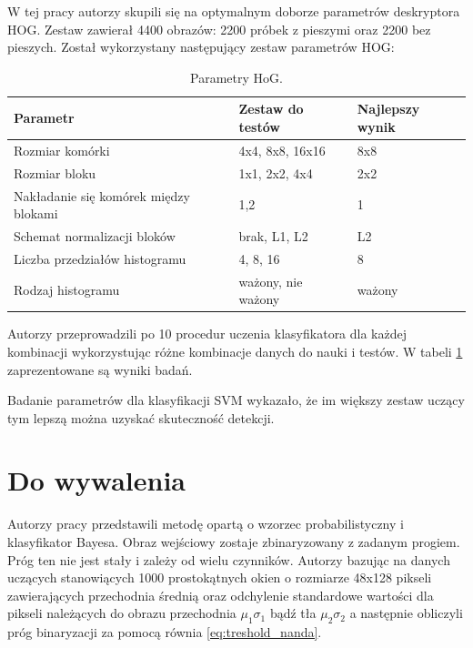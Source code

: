W tej pracy autorzy skupili się na optymalnym doborze parametrów deskryptora HOG. 
Zestaw zawierał 4400 obrazów: 2200 próbek z pieszymi oraz 2200 bez pieszych. 
Został wykorzystany następujący zestaw parametrów HOG:
\begin{table}[!h]
\centering 
\begin{threeparttable}
\caption{Parametry HoG.}
\label{tab:parametryhog}
\begin{tabularx}{1\textwidth}{|l|X|X|}


\hline Parametr & Zestaw do testów & Najlepszy wynik \\ 
\hline Rozmiar komórki & 4x4, 8x8, 16x16 & 8x8 \\ 
\hline Rozmiar bloku & 1x1, 2x2, 4x4 & 2x2 \\ 
\hline Nakładanie się komórek między blokami & 1,2 & 1 \\ 
\hline Schemat normalizacji bloków & brak, L1, L2 & L2 \\ 
\hline Liczba przedziałów histogramu & 4, 8, 16 & 8 \\ 
\hline Rodzaj histogramu & ważony, nie ważony & ważony \\ 
\hline 


\end{tabularx} 
\end{threeparttable}
\end{table} 

Autorzy przeprowadzili po 10 procedur uczenia klasyfikatora dla każdej kombinacji wykorzystując różne kombinacje danych do nauki i testów. W tabeli \ref{tab:parametryhog} zaprezentowane są wyniki badań.

Badanie parametrów dla klasyfikacji SVM wykazało, że im większy zestaw uczący tym lepszą można uzyskać skuteczność detekcji. 




\section{Do wywalenia}
Autorzy pracy \cite{nanda_2002} przedstawili metodę opartą o wzorzec probabilistyczny i klasyfikator Bayesa. 
Obraz wejściowy zostaje zbinaryzowany z zadanym progiem. 
Próg ten nie jest stały i zależy od wielu czynników. 
Autorzy bazując na danych uczących stanowiących 1000 prostokątnych okien o rozmiarze 48x128 pikseli zawierających przechodnia średnią oraz odchylenie standardowe wartości dla pikseli należących do obrazu przechodnia \( \mu_1 \sigma_1 \) bądź tła \( \mu_2 \sigma_2 \) a następnie obliczyli próg binaryzacji za pomocą równia \eqref{eq:treshold_nanda}. %

